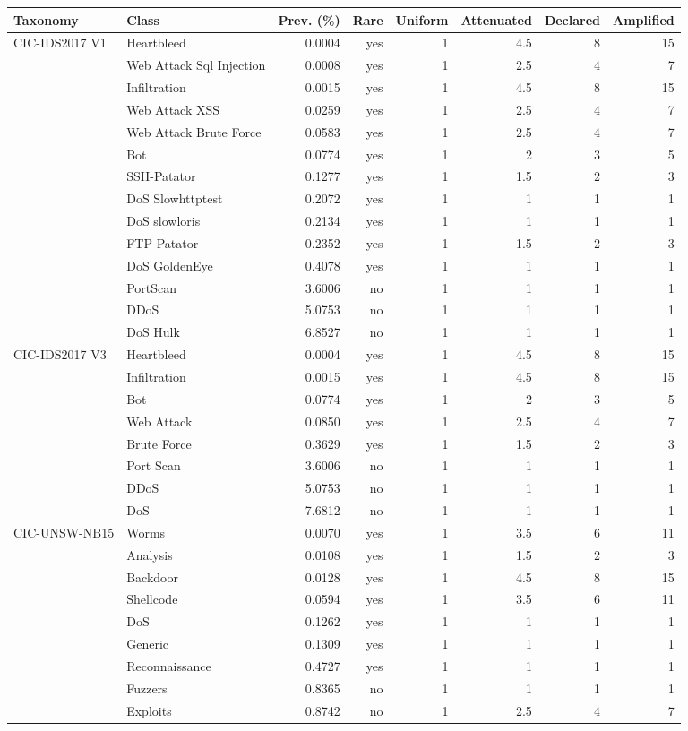 \begin{tabular}{@{}llrrrrrr@{}}
\toprule
Taxonomy & Class & Prev. (\%) & Rare & Uniform & Attenuated & Declared & Amplified \\
\midrule
CIC-IDS2017 V1 & Heartbleed & 0.0004 & yes & 1 & 4.5 & 8 & 15 \\
 & Web Attack  Sql Injection & 0.0008 & yes & 1 & 2.5 & 4 & 7 \\
 & Infiltration & 0.0015 & yes & 1 & 4.5 & 8 & 15 \\
 & Web Attack  XSS & 0.0259 & yes & 1 & 2.5 & 4 & 7 \\
 & Web Attack  Brute Force & 0.0583 & yes & 1 & 2.5 & 4 & 7 \\
 & Bot & 0.0774 & yes & 1 & 2 & 3 & 5 \\
 & SSH-Patator & 0.1277 & yes & 1 & 1.5 & 2 & 3 \\
 & DoS Slowhttptest & 0.2072 & yes & 1 & 1 & 1 & 1 \\
 & DoS slowloris & 0.2134 & yes & 1 & 1 & 1 & 1 \\
 & FTP-Patator & 0.2352 & yes & 1 & 1.5 & 2 & 3 \\
 & DoS GoldenEye & 0.4078 & yes & 1 & 1 & 1 & 1 \\
 & PortScan & 3.6006 & no & 1 & 1 & 1 & 1 \\
 & DDoS & 5.0753 & no & 1 & 1 & 1 & 1 \\
 & DoS Hulk & 6.8527 & no & 1 & 1 & 1 & 1 \\
\addlinespace
CIC-IDS2017 V3 & Heartbleed & 0.0004 & yes & 1 & 4.5 & 8 & 15 \\
 & Infiltration & 0.0015 & yes & 1 & 4.5 & 8 & 15 \\
 & Bot & 0.0774 & yes & 1 & 2 & 3 & 5 \\
 & Web Attack & 0.0850 & yes & 1 & 2.5 & 4 & 7 \\
 & Brute Force & 0.3629 & yes & 1 & 1.5 & 2 & 3 \\
 & Port Scan & 3.6006 & no & 1 & 1 & 1 & 1 \\
 & DDoS & 5.0753 & no & 1 & 1 & 1 & 1 \\
 & DoS & 7.6812 & no & 1 & 1 & 1 & 1 \\
\addlinespace
CIC-UNSW-NB15 & Worms & 0.0070 & yes & 1 & 3.5 & 6 & 11 \\
 & Analysis & 0.0108 & yes & 1 & 1.5 & 2 & 3 \\
 & Backdoor & 0.0128 & yes & 1 & 4.5 & 8 & 15 \\
 & Shellcode & 0.0594 & yes & 1 & 3.5 & 6 & 11 \\
 & DoS & 0.1262 & yes & 1 & 1 & 1 & 1 \\
 & Generic & 0.1309 & yes & 1 & 1 & 1 & 1 \\
 & Reconnaissance & 0.4727 & yes & 1 & 1 & 1 & 1 \\
 & Fuzzers & 0.8365 & no & 1 & 1 & 1 & 1 \\
 & Exploits & 0.8742 & no & 1 & 2.5 & 4 & 7 \\
\bottomrule
\end{tabular}
